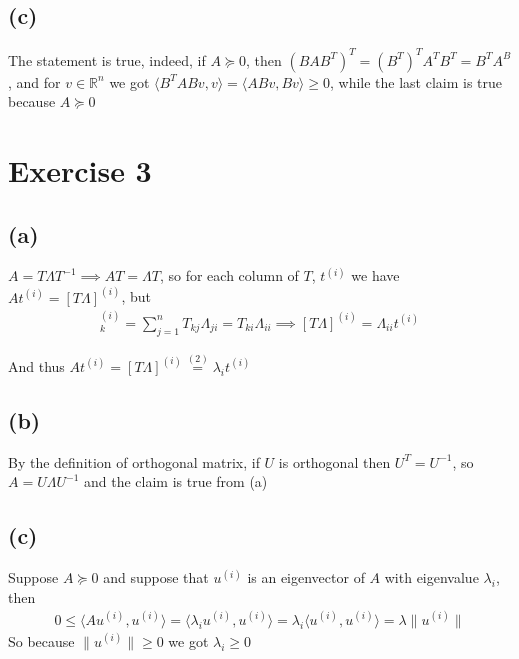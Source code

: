 \documentclass{article}
\begin{document}
\subsection*{(c)}
The statement is true, indeed, if $A\succeq 0$, then $(BAB^T)^T=(B^T)^TA^TB^T=B^TA^B$, and for $v \in \mathbb{R}^n$ we got $\langle B^TABv,v \rangle = \langle ABv,Bv \rangle \ge 0$, while the last claim is true because $A \succeq 0$

\section*{Exercise 3}

\subsection*{(a)}

$A=T\Lambda T^{-1} \implies AT=\Lambda T$, so for each column of $T$, $t^{(i)}$ we have $At^{(i)}=[T\Lambda]^{(i)}$, but
\begin{align*}
  [T\Lambda]_{k}^{(i)}=\sum_{j=1}^{n}T_{kj}\Lambda_{ji}=T_{ki}\Lambda_{ii} \implies [T\Lambda]^{(i)}=\Lambda_{ii}t^{(i)}
\end{align*}

And thus $At^{(i)}=[T\Lambda]^{(i)}\overset{(2)}{=}\lambda_{i}t^{(i)}$


\subsection*{(b)}

By the definition of orthogonal matrix, if $U$ is orthogonal then $U^T=U^{-1}$, so $A=U\Lambda U^{-1}$ and the claim is true from (a)

\subsection*{(c)}

Suppose $A \succeq 0$ and suppose that $u^{(i)}$ is an eigenvector of $A$ with eigenvalue $\lambda_{i}$, then
\begin{align*}
  0 \le \langle Au^{(i)},u^{(i)} \rangle = \langle \lambda_{i}u^{(i)},u^{(i)} \rangle = \lambda_i \langle u^{(i)}, u^{(i)} \rangle = \lambda \|u^{(i)} \|
\end{align*}
So because $\| u^{(i)} \| \ge 0$ we got $\lambda_i \ge 0$
\end{document}
